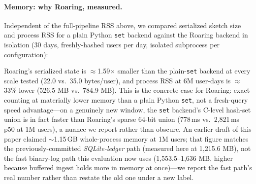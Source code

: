 \documentclass[sigconf,anonymous,review]{acmart}
\begin{document}
\paragraph{Memory: why Roaring, measured.} Independent of the full-pipeline RSS above, we compared serialized sketch size and process RSS for a plain Python \texttt{set} backend against the Roaring backend in isolation (30 days, freshly-hashed users per day, isolated subprocess per configuration):

\begin{table}[H]
    \centering
    \caption{Set vs.\ Roaring: Serialized State and Process RSS (Measured)}
    \label{tab:memory}
\end{table}

Roaring's serialized state is $\approx$1.59$\times$ smaller than the plain-\texttt{set} backend at every scale tested (22.0 vs.\ 35.0 bytes/user), and process RSS at 6M user-days is $\approx$33\% lower (526.5 MB vs.\ 784.9 MB). This is the concrete case for Roaring: exact counting at materially lower memory than a plain Python \texttt{set}, not a fresh-query speed advantage---on a genuinely new window, the \texttt{set} backend's C-level hash-set union is in fact faster than Roaring's sparse 64-bit union (778\,ms vs.\ 2,821\,ms p50 at 1M users), a nuance we report rather than obscure. An earlier draft of this paper claimed $\sim$1.15\,GB whole-process memory at 1M users; that figure matches the previously-committed \emph{SQLite-ledger} path (measured here at 1,215.6 MB), not the fast binary-log path this evaluation now uses (1,553.5--1,636 MB, higher because buffered ingest holds more in memory at once)---we report the fast path's real number rather than restate the old one under a new label.
\end{document}
